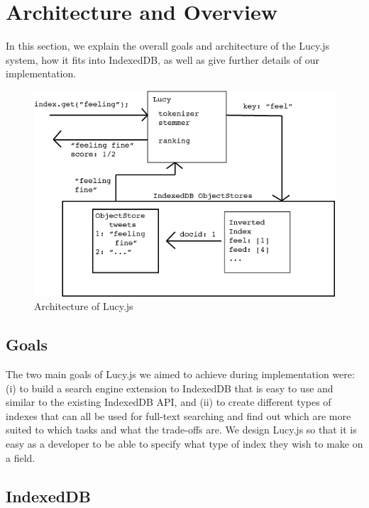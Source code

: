 \documentclass{vldb}
\begin{document}
\section{Architecture and Overview}

In this section, we explain the overall goals and architecture of the Lucy.js system, how it fits into IndexedDB, as well as give further details of our implementation. 


\begin{figure}[]
	\includegraphics[scale=.43]{arch}
	\caption{Architecture of Lucy.js}
\end{figure}

\subsection{Goals}

The two main goals of Lucy.js we aimed to achieve during implementation were: (i) to build a search engine extension to IndexedDB that is easy to use and similar to the existing IndexedDB API, and (ii) to create different types of indexes that can all be used for full-text searching and find out which are more suited to which tasks and what the trade-offs are. We design Lucy.js so that it is easy as a developer to be able to specify what type of index they wish to make on a field.

\subsection{IndexedDB}
\end{document}
